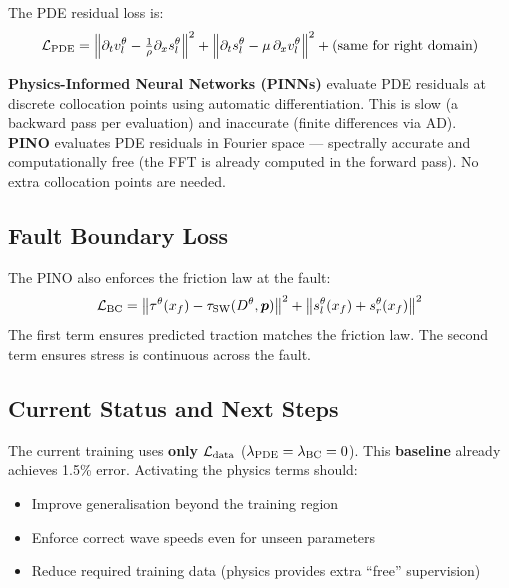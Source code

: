 \documentclass[12pt, a4paper]{article}
\theoremstyle{definition}
\newcommand{\loss}{\mathcal{L}}
\newcommand{\vl}{v_l}
\newcommand{\ssl}{s_l}
\begin{document}
The PDE residual loss is:
\begin{equation}
  \loss_{\rm PDE} =
  \Bigl\|\partial_t \vl^\theta - \tfrac{1}{\rho}\partial_x \ssl^\theta\Bigr\|^2 +
  \Bigl\|\partial_t \ssl^\theta - \mu\,\partial_x \vl^\theta\Bigr\|^2 +
  \text{(same for right domain)}
  \label{eq:pde_loss}
\end{equation}

\begin{tcolorbox}[highlight=myblue, title=PINO vs. PINN: A Critical Distinction]
  \textbf{Physics-Informed Neural Networks (PINNs)} evaluate PDE residuals
  at discrete collocation points using automatic differentiation.  This is slow
  (a backward pass per evaluation) and inaccurate (finite differences via AD).\\[4pt]
  \textbf{PINO} evaluates PDE residuals in Fourier space — spectrally accurate
  and computationally free (the FFT is already computed in the forward pass).
  No extra collocation points are needed.
\end{tcolorbox}

\subsection{Fault Boundary Loss}

The PINO also enforces the friction law at the fault:
\begin{equation}
  \loss_{\rm BC} =
  \bigl\|\tau^\theta(x_f) - \tau_{\rm SW}(D^\theta, \bm{p})\bigr\|^2 +
  \bigl\|s_l^\theta(x_f) + s_r^\theta(x_f)\bigr\|^2
  \label{eq:bc_loss}
\end{equation}
The first term ensures predicted traction matches the friction law.  The second
term ensures stress is continuous across the fault.

\subsection{Current Status and Next Steps}

The current training uses \textbf{only} $\loss_{\rm data}$ ($\lambda_{\rm PDE}
= \lambda_{\rm BC} = 0$).  This \textbf{baseline} already achieves 1.5\% error.
Activating the physics terms should:
\begin{itemize}
  \item Improve generalisation beyond the training region
  \item Enforce correct wave speeds even for unseen parameters
  \item Reduce required training data (physics provides extra ``free'' supervision)
\end{itemize}
\end{document}
